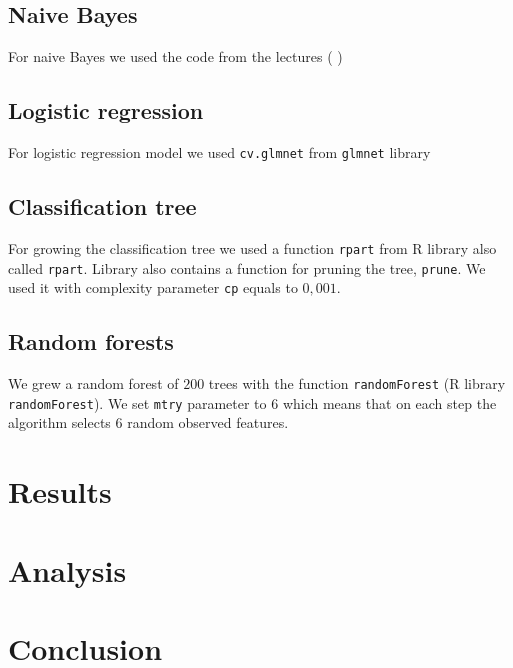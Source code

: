 \documentclass[a4paper,11pt]{article}
\begin{document}
\subsection{Naive Bayes}
\label{subsec: naivebayes}
For naive Bayes we used the code from the lectures (%
) 

\subsection{Logistic regression}
\label{subsec: logisticregression}
For logistic regression model we used \verb|cv.glmnet| from \verb|glmnet| library

\subsection{Classification tree}
\label{subsec: classificationtree}
For growing the classification tree we used a function \verb|rpart| from R library also called \verb|rpart|. Library also contains a function for pruning the tree, \verb|prune|. We used it with complexity parameter \verb|cp| equals to $0{,}001$.

\subsection{Random forests}
\label{subsec: randomforests}
We grew a random forest of $200$ trees with the function \verb|randomForest| (R library \verb|randomForest|). We set \verb|mtry| parameter to $6$ which means that on each step the algorithm selects $6$ random observed features.

\section{Results}
\label{sec: results}

\section{Analysis}
\label{sec: analysis}

\section{Conclusion}



\end{document}
